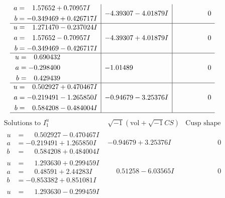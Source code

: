 \documentclass[1p]{elsarticle_modified}
\theoremstyle{definition}
\newcommand{\I}{\sqrt{-1}}
\begin{document}
$$\begin{array}{c|c|c}
\begin{aligned}
a &= \phantom{-}1.57652 + 0.70957 I \\
b &= -0.349469 + 0.426717 I\end{aligned}
 & -4.39307 - 4.01879 I & \phantom{-0.000000 } 0 \\ \hline\begin{aligned}
u &= \phantom{-}1.271470 - 0.237024 I \\
a &= \phantom{-}1.57652 - 0.70957 I \\
b &= -0.349469 - 0.426717 I\end{aligned}
 & -4.39307 + 4.01879 I & \phantom{-0.000000 } 0 \\ \hline\begin{aligned}
u &= \phantom{-}0.690432\phantom{ +0.000000I} \\
a &= -0.298400\phantom{ +0.000000I} \\
b &= \phantom{-}0.429439\phantom{ +0.000000I}\end{aligned}
 & -1.01489\phantom{ +0.000000I} & \phantom{-0.000000 } 0 \\ \hline\begin{aligned}
u &= \phantom{-}0.502927 + 0.470467 I \\
a &= -0.219491 - 1.265850 I \\
b &= \phantom{-}0.584208 - 0.484004 I\end{aligned}
 & -0.94679 - 3.25376 I & \phantom{-0.000000 } 0\\
 \hline 
 \end{array}$$\newpage$$\begin{array}{c|c|c}  
\text{Solutions to }I^u_{1}& \I (\text{vol} + \sqrt{-1}CS) & \text{Cusp shape}\\
 \hline 
\begin{aligned}
u &= \phantom{-}0.502927 - 0.470467 I \\
a &= -0.219491 + 1.265850 I \\
b &= \phantom{-}0.584208 + 0.484004 I\end{aligned}
 & -0.94679 + 3.25376 I & \phantom{-0.000000 } 0 \\ \hline\begin{aligned}
u &= \phantom{-}1.293630 + 0.299459 I \\
a &= \phantom{-}0.48591 + 2.44283 I \\
b &= -0.853382 + 0.851081 I\end{aligned}
 & \phantom{-}0.51258 - 6.03565 I & \phantom{-0.000000 } 0 \\ \hline\begin{aligned}
u &= \phantom{-}1.293630 - 0.299459 I \\

\end{aligned}
\end{array}$$
\end{document}
